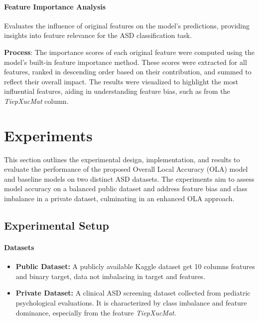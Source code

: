 \documentclass[conference]{IEEEtran}
\begin{document}
\paragraph{Feature Importance Analysis}

Evaluates the influence of original features on the model's predictions, providing insights into feature relevance for the ASD classification task.

\textbf{Process}: The importance scores of each original feature were computed using the model's built-in feature importance method. These scores were extracted for all features, ranked in descending order based on their contribution, and summed to reflect their overall impact. The results were visualized to highlight the most influential features, aiding in understanding feature bias, such as from the \textit{TiepXucMat} column.



\section{Experiments}
This section outlines the experimental design, implementation, and results to evaluate the performance of the proposed Overall Local Accuracy (OLA) model and baseline models on two distinct ASD datasets. The experiments aim to assess model accuracy on a balanced public dataset and address feature bias and class imbalance in a private dataset, culminating in an enhanced OLA approach.

\subsection{Experimental Setup}
\paragraph{\textbf{Datasets}}
\begin{itemize}
\item \textbf{Public Dataset:} A publicly available Kaggle dataset get 10 columns features and binary target, data not imbalacing in target and features. 
\item \textbf{Private Dataset:} A clinical ASD screening dataset collected from pediatric psychological evaluations. It is characterized by class imbalance and feature dominance, especially from the feature \textit{TiepXucMat}.
\end{itemize}
\end{document}
